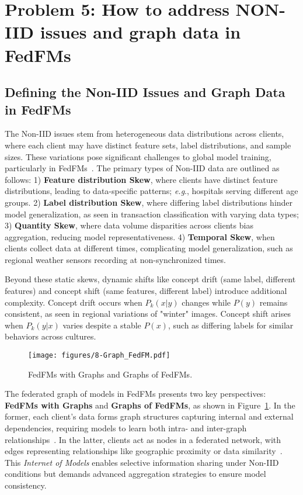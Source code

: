 \section{Problem 5: How to address NON-IID issues and graph data in FedFMs}


\subsection{Defining the Non-IID Issues and Graph Data in FedFMs}


The Non-IID issues stem from heterogeneous data distributions across clients, where each client may have distinct feature sets, label distributions, and sample sizes. These variations pose significant challenges to global model training, particularly in FedFMs~\cite{ren2024advances,zhong2023semi, Yang_Zhang_Dai_Pan_2020}. The primary types of Non-IID data are outlined as follows: 1) \textbf{Feature distribution Skew}, where clients have distinct feature distributions, leading to data-specific patterns; \textit{e.g}., hospitals serving different age groups. 2) \textbf{Label distribution Skew}, where differing label distributions hinder model generalization, as seen in transaction classification with varying data types; 3) \textbf{Quantity Skew}, where data volume disparities across clients bias aggregation, reducing model representativeness. 4) \textbf{Temporal Skew}, when clients collect data at different times, complicating model generalization, such as regional weather sensors recording at non-synchronized times.

Beyond these static skews, dynamic shifts like concept drift (same label, different features) and concept shift (same features, different label) introduce additional complexity. Concept drift occurs when $P_k(x | y)$ changes while $P(y)$ remains consistent, as seen in regional variations of "winter" images. Concept shift arises when $P_k(y | x)$ varies despite a stable $P(x)$, such as differing labels for similar behaviors across cultures.


\begin{figure}[htbp]
    \centering
    \texttt{[image: figures/8-Graph\_FedFM.pdf]}
    \caption{FedFMs with Graphs and Graphs of FedFMs.}
    \label{fig:Graph-FM}
    \vspace{-3mm}
\end{figure}

The federated graph of models in FedFMs presents two key perspectives: \textbf{FedFMs with Graphs} and \textbf{Graphs of FedFMs}, as shown in Figure~\ref{fig:Graph-FM}. In the former, each client’s data forms graph structures capturing internal and external dependencies, requiring models to learn both intra- and inter-graph relationships~\cite{zhang2021federated}. In the latter, clients act as nodes in a federated network, with edges representing relationships like geographic proximity or data similarity~\cite{fu2022federated}. This \textit{Internet of Models} enables selective information sharing under Non-IID conditions but demands advanced aggregation strategies to ensure model consistency.


